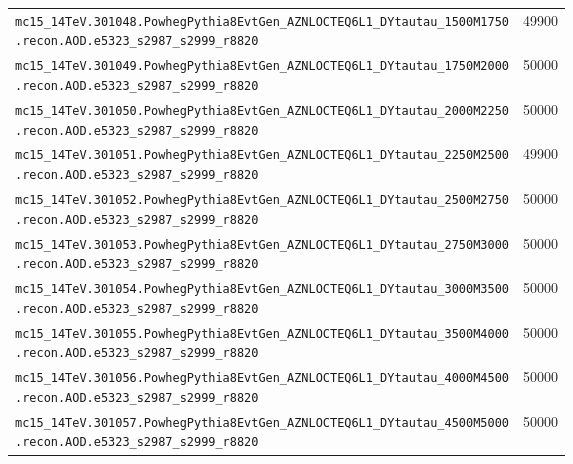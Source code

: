 \begin{minipage}{\textwidth}
{\begin{tabular}{p{13cm}S[table-format=6.0]}
    \texttt{mc15\_14TeV.301048.PowhegPythia8EvtGen\_AZNLOCTEQ6L1\_DYtautau\_1500M1750\newline\hspace*{1em}.recon.AOD.e5323\_s2987\_s2999\_r8820} & 49900 \\
    \texttt{mc15\_14TeV.301049.PowhegPythia8EvtGen\_AZNLOCTEQ6L1\_DYtautau\_1750M2000\newline\hspace*{1em}.recon.AOD.e5323\_s2987\_s2999\_r8820} & 50000 \\
    \texttt{mc15\_14TeV.301050.PowhegPythia8EvtGen\_AZNLOCTEQ6L1\_DYtautau\_2000M2250\newline\hspace*{1em}.recon.AOD.e5323\_s2987\_s2999\_r8820} & 50000 \\
    \texttt{mc15\_14TeV.301051.PowhegPythia8EvtGen\_AZNLOCTEQ6L1\_DYtautau\_2250M2500\newline\hspace*{1em}.recon.AOD.e5323\_s2987\_s2999\_r8820} & 49900 \\
    \texttt{mc15\_14TeV.301052.PowhegPythia8EvtGen\_AZNLOCTEQ6L1\_DYtautau\_2500M2750\newline\hspace*{1em}.recon.AOD.e5323\_s2987\_s2999\_r8820} & 50000 \\
    \texttt{mc15\_14TeV.301053.PowhegPythia8EvtGen\_AZNLOCTEQ6L1\_DYtautau\_2750M3000\newline\hspace*{1em}.recon.AOD.e5323\_s2987\_s2999\_r8820} & 50000 \\
    \texttt{mc15\_14TeV.301054.PowhegPythia8EvtGen\_AZNLOCTEQ6L1\_DYtautau\_3000M3500\newline\hspace*{1em}.recon.AOD.e5323\_s2987\_s2999\_r8820} & 50000 \\
    \texttt{mc15\_14TeV.301055.PowhegPythia8EvtGen\_AZNLOCTEQ6L1\_DYtautau\_3500M4000\newline\hspace*{1em}.recon.AOD.e5323\_s2987\_s2999\_r8820} & 50000 \\
    \texttt{mc15\_14TeV.301056.PowhegPythia8EvtGen\_AZNLOCTEQ6L1\_DYtautau\_4000M4500\newline\hspace*{1em}.recon.AOD.e5323\_s2987\_s2999\_r8820} & 50000 \\
    \texttt{mc15\_14TeV.301057.PowhegPythia8EvtGen\_AZNLOCTEQ6L1\_DYtautau\_4500M5000\newline\hspace*{1em}.recon.AOD.e5323\_s2987\_s2999\_r8820} & 50000 \\

\end{tabular}}
\end{minipage}
